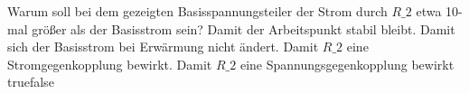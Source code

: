     {Warum soll bei dem gezeigten Basisspannungsteiler der Strom durch $R\_2$ etwa 10-mal größer als der Basisstrom sein?}
    {Damit der Arbeitspunkt stabil bleibt.}
    {Damit sich der Basisstrom bei Erwärmung nicht ändert.}
    {Damit $R\_2$ eine Stromgegenkopplung bewirkt.}
    {Damit $R\_2$ eine Spannungsgegenkopplung bewirkt}
    {true}{false}